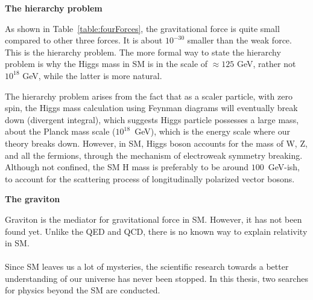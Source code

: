 {\bf The hierarchy problem}

As shown in Table~\ref{table:fourForces}, the gravitational force is quite small compared 
to other three forces. It is about $10^{-30}$ smaller than the weak force. This is the 
hierarchy problem. 
The more formal way to state the hierarchy problem is why the Higgs mass in SM is in the scale of
${\approx}125$ GeV, 
rather not $10^{18}$ GeV, while the latter is more natural. 

The hierarchy problem arises from the fact that as a scaler particle, with zero spin, the Higgs 
mass calculation using Feynman diagrams will eventually break down (divergent integral), which 
suggests Higgs particle possesses a large mass, about the Planck mass scale ($10^{18}$~GeV), which is the 
energy scale where our theory breaks down. 
However, in SM, Higgs boson accounts for the mass of W, Z, and all the fermions, through the 
mechanism of electroweak symmetry breaking. Although not confined, 
the SM H mass is preferably to be around $100$~GeV-ish, to account for 
the scattering process of longitudinally polarized vector bosons.  



{\bf The graviton}

 Graviton is the mediator for gravitational force in SM. However, it has not been found yet. 
 Unlike the QED and QCD, there is no known way to explain relativity in SM. 
 \\
 \\
 Since SM leaves us a lot of mysteries,  the scientific research towards a better understanding of 
 our universe has never been stopped. In this thesis, two searches for physics beyond the SM are 
 conducted. 
 





